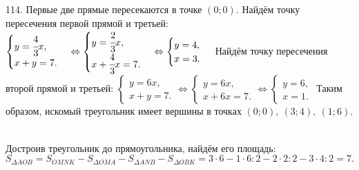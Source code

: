 114. Первые две прямые пересекаются в точке $(0;0).$ Найдём точку пересечения первой прямой и третьей: $\begin{cases}y=\cfrac{4}{3}x,\\ x+y=7.\end{cases}
\Leftrightarrow \begin{cases}y=\cfrac{2}{3}x,\\ x+\cfrac{4}{3}x=7.\end{cases}
\Leftrightarrow \begin{cases}y=4,\\ x=3.\end{cases}$ Найдём точку пересечения второй прямой и третьей: $\begin{cases}y=6x,\\ x+y=7.\end{cases}
\Leftrightarrow \begin{cases}y=6x,\\ x+6x=7.\end{cases}
\Leftrightarrow \begin{cases}y=6,\\ x=1.\end{cases}$ Таким образом, искомый треугольник имеет вершины в точках $(0;0),\ (3;4),\ (1;6).$\\
\begin{figure}[ht!]
\end{figure}\\
Достроив треугольник до прямоугольника, найдём его площадь: $S_{\Delta AOB}=S_{OMNK}-S_{\Delta OMA}-S_{\Delta ANB}-S_{\Delta OBK}=
3\cdot6-1\cdot6:2-2\cdot2:2-3\cdot4:2=7.$\\
